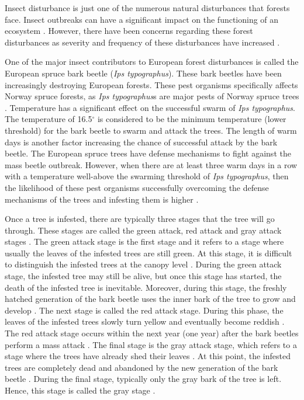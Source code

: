 \documentclass[a4paper, twoside]{templates/ociamthesis}
\begin{document}
Insect disturbance is just one of the numerous natural disturbances that forests face. Insect outbreaks can have a significant impact on the functioning of an ecosystem \citep{raffa2009literal}. However, there have been concerns regarding these forest disturbances as severity and frequency of these disturbances have increased \citep{millar2015temperate}.

One of the major insect contributors to European forest disturbances is called the European spruce bark beetle (\emph{Ips typographus}). These bark beetles have been increasingly destroying European forests. These pest organisms specifically affects Norway spruce forests, as \emph{Ips typographus}s are major pests of Norway spruce trees \citep{ohrn2014seasonal}. Temperature has a significant effect on the successful swarm of \emph{Ips typographus}. The temperature of 16.5\(^\circ\) is considered to be the minimum temperature (lower threshold) for the bark beetle to swarm and attack the trees. The length of warm days is another factor increasing the chance of successful attack by the bark beetle. The European spruce trees have defense mechanisms to fight against the mass beetle outbreak. However, when there are at least three warm days in a row with a temperature well-above the swarming threshold of \emph{Ips typographus}, then the likelihood of these pest organisms successfully overcoming the defense mechanisms of the trees and infesting them is higher \citep{wermelinger2004ecology}.

Once a tree is infested, there are typically three stages that the tree will go through. These stages are called the green attack, red attack and gray attack stages \citep{sprintsin2011combining}. The green attack stage is the first stage and it refers to a stage where usually the leaves of the infested trees are still green. At this stage, it is difficult to distinguish the infested trees at the canopy level \citep{wulder2006estimating}. During the green attack stage, the infested tree may still be alive, but once this stage has started, the death of the infested tree is inevitable. Moreover, during this stage, the freshly hatched generation of the bark beetle uses the inner bark of the tree to grow and develop \citep{niemann2005assessment}. The next stage is called the red attack stage. During this phase, the leaves of the infested trees slowly turn yellow and eventually become reddish \citep{fernandez2020monitoring}. The red attack stage occurs within the next year (one year) after the bark beetles perform a mass attack \citep{niemann2005assessment}. The final stage is the gray attack stage, which refers to a stage where the trees have already shed their leaves \citep{wulder2009challenges}. At this point, the infested trees are completely dead and abandoned by the new generation of the bark beetle \citep{niemann2005assessment}. During the final stage, typically only the gray bark of the tree is left. Hence, this stage is called the gray stage \citep{abdullah2019sensitivity}.
\end{document}
